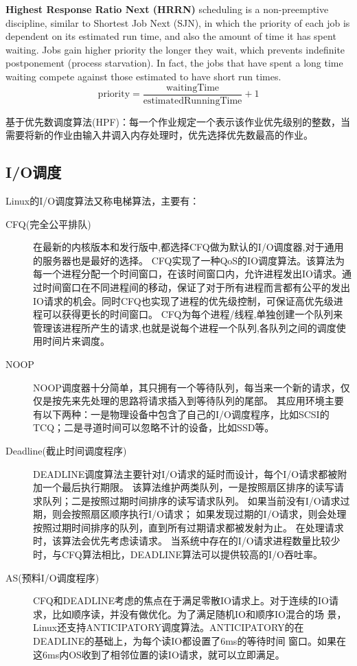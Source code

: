 \textbf{Highest Response Ratio Next (HRRN)} scheduling is a non-preemptive discipline, similar to Shortest Job Next (SJN), in which the priority of each job is dependent on its estimated run time, and also the amount of time it has spent waiting. Jobs gain higher priority the longer they wait, which prevents indefinite postponement (process starvation). In fact, the jobs that have spent a long time waiting compete against those estimated to have short run times.
\begin{equation}
\mathrm{priority}=\frac{\mathrm{waitingTime}}{\mathrm{estimated Running Time}} + 1
\end{equation}

基于优先数调度算法(HPF)：每一个作业规定一个表示该作业优先级别的整数，当需要将新的作业由输入井调入内存处理时，优先选择优先数最高的作业。


\subsection{I/O调度}
Linux的I/O调度算法又称电梯算法，主要有：
\begin{description}
    \item[CFQ(完全公平排队)] 在最新的内核版本和发行版中,都选择CFQ做为默认的I/O调度器,对于通用的服务器也是最好的选择。	CFQ实现了一种QoS的IO调度算法。该算法为每一个进程分配一个时间窗口，在该时间窗口内，允许进程发出IO请求。通过时间窗口在不同进程间的移动，保证了对于所有进程而言都有公平的发出IO请求的机会。同时CFQ也实现了进程的优先级控制，可保证高优先级进程可以获得更长的时间窗口。
	CFQ为每个进程/线程,单独创建一个队列来管理该进程所产生的请求,也就是说每个进程一个队列,各队列之间的调度使用时间片来调度。
    \item[NOOP] NOOP调度器十分简单，其只拥有一个等待队列，每当来一个新的请求，仅仅是按先来先处理的思路将请求插入到等待队列的尾部。
其应用环境主要有以下两种：一是物理设备中包含了自己的I/O调度程序，比如SCSI的TCQ；二是寻道时间可以忽略不计的设备，比如SSD等。
    \item[Deadline(截止时间调度程序)] DEADLINE调度算法主要针对I/O请求的延时而设计，每个I/O请求都被附加一个最后执行期限。
	该算法维护两类队列，一是按照扇区排序的读写请求队列；二是按照过期时间排序的读写请求队列。
	如果当前没有I/O请求过期，则会按照扇区顺序执行I/O请求；
	如果发现过期的I/O请求，则会处理按照过期时间排序的队列，直到所有过期请求都被发射为止。
	在处理请求时，该算法会优先考虑读请求。
	当系统中存在的I/O请求进程数量比较少时，与CFQ算法相比，DEADLINE算法可以提供较高的I/O吞吐率。
\item[AS(预料I/O调度程序)]CFQ和DEADLINE考虑的焦点在于满足零散IO请求上。对于连续的IO请求，比如顺序读，并没有做优化。为了满足随机IO和顺序IO混合的场 景，Linux还支持ANTICIPATORY调度算法。ANTICIPATORY的在DEADLINE的基础上，为每个读IO都设置了6ms的等待时间 窗口。如果在这6ms内OS收到了相邻位置的读IO请求，就可以立即满足。
\end{description}


